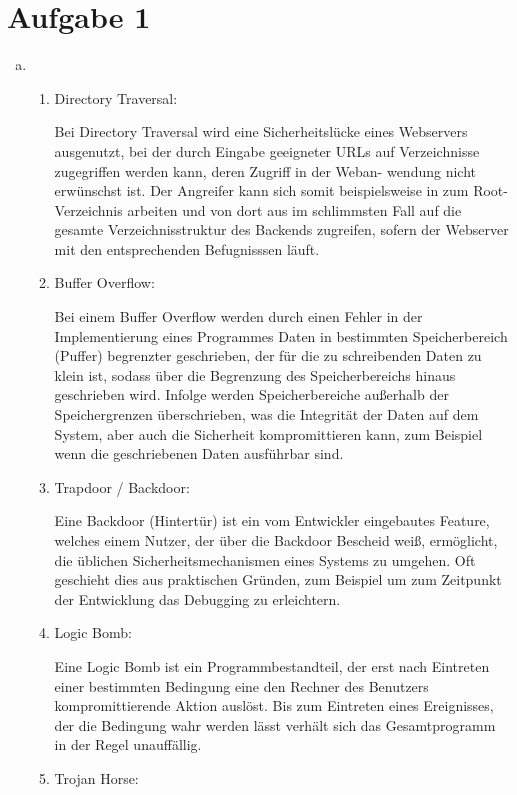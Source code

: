 \documentclass[numbers=noendperiod]{scrartcl}
\begin{document}
\section*{Aufgabe 1}
\begin{enumerate}[a)]
	\item 
	\begin{enumerate}
		\item Directory Traversal:
		
		Bei Directory Traversal wird eine Sicherheitslücke eines Webservers ausgenutzt, bei der durch
		Eingabe geeigneter URLs auf Verzeichnisse zugegriffen werden kann, deren Zugriff in der Weban-
		wendung nicht erwünschst ist. Der Angreifer kann sich somit beispielsweise in zum Root-Verzeichnis
		arbeiten und von dort aus im schlimmsten Fall auf die gesamte Verzeichnisstruktur des Backends zugreifen, sofern der
		Webserver mit den entsprechenden Befugnisssen läuft.
		
		\item Buffer Overflow:
		
		Bei einem Buffer Overflow werden durch einen Fehler in der Implementierung eines Programmes Daten in
		bestimmten Speicherbereich (Puffer) begrenzter geschrieben, der für die zu schreibenden Daten zu klein
		ist, sodass über die Begrenzung des Speicherbereichs hinaus geschrieben wird. Infolge werden Speicherbereiche
		außerhalb der Speichergrenzen überschrieben, was die Integrität der Daten auf dem System, aber auch die
		Sicherheit kompromittieren kann, zum Beispiel wenn die geschriebenen Daten ausführbar sind.
		
		\item Trapdoor / Backdoor:
		
		Eine Backdoor (Hintertür) ist ein vom Entwickler eingebautes Feature, welches einem Nutzer, der über
		die Backdoor Bescheid weiß, ermöglicht, die üblichen Sicherheitsmechanismen eines Systems zu umgehen.
		Oft geschieht dies aus praktischen Gründen, zum Beispiel um zum Zeitpunkt der Entwicklung das Debugging
		zu erleichtern.
		
		\item Logic Bomb:
		
		Eine Logic Bomb ist ein Programmbestandteil, der erst nach Eintreten einer bestimmten Bedingung eine den
		Rechner des Benutzers kompromittierende Aktion auslöst. Bis zum Eintreten eines Ereignisses, der die
		Bedingung wahr werden lässt verhält sich das Gesamtprogramm in der Regel unauffällig.
		
		\item Trojan Horse:
		

\end{enumerate}
\end{enumerate}
\end{document}
